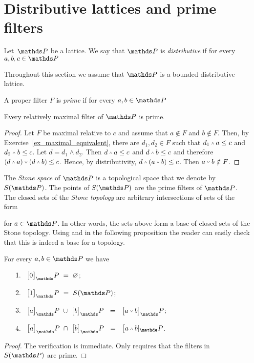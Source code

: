 \documentclass[creche.tex]{subfiles}
\begin{document}
\section{Distributive lattices and prime filters}\label{prime_filters}

Let\ $\PP$ be a lattice. We say that $\PP$ is \emph{distributive\/} if for every $a,b,c\in\PP$



Throughout this section we assume that $\PP$ is a bounded distributive lattice.

A proper filter $F$ is \emph{prime\/} if for every $a,b\in\PP$


\begin{proposition}\label{prop_massimalisonoprimi}
Every relatively maximal filter of\/ $\PP$ is prime.
\end{proposition}

\begin{proof}
Let $F$ be maximal relative to $c$ and assume that $a\notin F$ and $b\notin F$. Then, by Exercise~\ref{ex_maximal_equivalent}, there are $d_1, d_2\in F$ such that $d_1\swedge a\le c$ and $d_2\swedge b\le c$. Let $d=d_1\wedge d_2$. Then  $d\swedge a\le c$ and $d\swedge b\le c$ and therefore $(d\swedge a)\svee(d\swedge b)\le c$. Hence, by distributivity, $d\swedge (a\svee b)\le c$. Then $a\svee b\notin F$.
\end{proof}

The \emph{Stone space\/} of $\PP$ is a topological space that we denote by \emph{$S(\PP)$}. The points of \emph{$S(\PP)$} are the prime filters of $\PP$. The closed sets of the \emph{Stone topology} are arbitrary intersections of sets of the form


for $a\in\PP$. In other words, the sets above form a base of closed sets of the Stone topology. Using  and  in the following proposition the reader can easily check that this is indeed a base for a topology.

\begin{proposition}\label{prop_brouwerstopology}
For every $a,b\in\PP$ we have
\begin{itemize}
\item[1.]\ $\big[0\big]_\PP\ =\ \0$;
\item[2.]\ $\big[1\big]_\PP\ =\ S(\PP)$;
\item[3.]\ $\big[a\big]_\PP\ \cup\ \big[b\big]_\PP\ \ =\ \ \big[a\svee b\big]_\PP$;
\item[4.]\ $\big[a\big]_\PP\ \cap\ \big[b\big]_\PP\ \ =\ \ \big[a\swedge b]_\PP$.
\end{itemize}
\end{proposition}
\begin{proof}
The verification is immediate. Only  requires that the filters in $S(\PP)$ are prime.
\end{proof}
\end{document}
